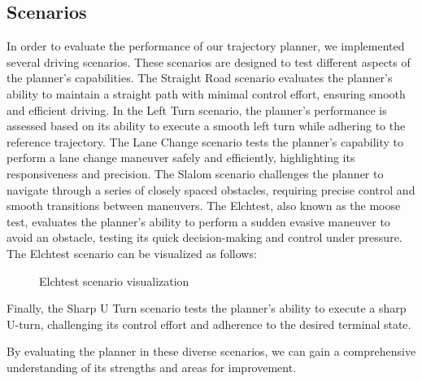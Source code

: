 \subsection{Scenarios} \label{subsec:scenarios}

In order to evaluate the performance of our trajectory planner, we implemented several driving scenarios.
These scenarios are designed to test different aspects of the planner's capabilities.
The Straight Road scenario evaluates the planner's ability to maintain a straight path with minimal control effort, ensuring smooth and efficient
driving.
In the Left Turn scenario, the planner's performance is assessed based on its ability to execute a smooth left turn while adhering to the reference
trajectory.
The Lane Change scenario tests the planner's capability to perform a lane change maneuver safely and efficiently, highlighting its responsiveness and
precision.
The Slalom scenario challenges the planner to navigate through a series of closely spaced obstacles, requiring precise control and smooth transitions
between maneuvers.
The Elchtest, also known as the moose test, evaluates the planner's ability to perform a sudden evasive maneuver to avoid an obstacle, testing its
quick decision-making and control under pressure.
The Elchtest scenario can be visualized as follows:
\begin{figure}[H]
	\centering
	\caption{Elchtest scenario visualization}
	\label{fig:elchtest}
\end{figure}

Finally, the Sharp U Turn scenario tests the planner's ability to execute a sharp U-turn, challenging its control effort and adherence to the desired
terminal state.

By evaluating the planner in these diverse scenarios, we can gain a comprehensive understanding of its strengths and areas for improvement.

